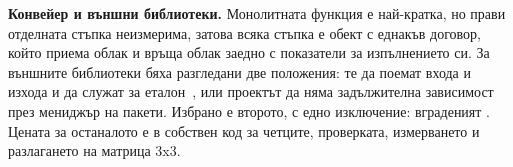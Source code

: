 \textbf{Конвейер и външни библиотеки.} Монолитната функция е най-кратка, но прави отделната
стъпка неизмерима, затова всяка стъпка е обект с еднакъв договор, който приема облак и връща
облак заедно с показатели за изпълнението си. За външните библиотеки бяха разгледани две
положения: те да поемат входа и изхода и да служат за
еталон~\cite{rusu2011pcl,bradski2000opencv}, или проектът да няма задължителна зависимост през
мениджър на пакети. Избрано е второто, с едно изключение: вграденият . Цената за
останалото е в собствен код за четците, проверката, измерването и разлагането на матрица 3x3.
